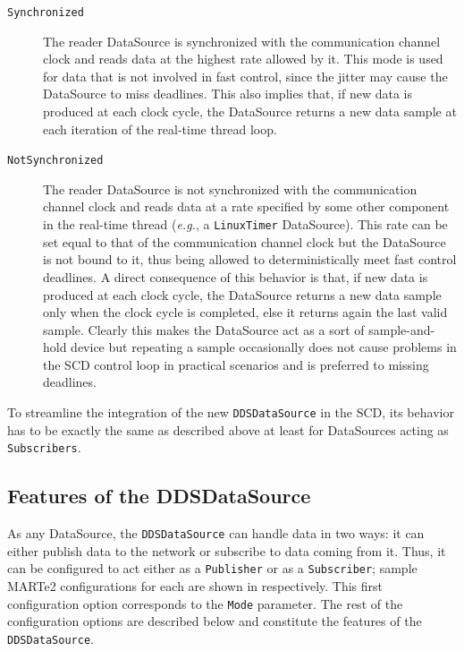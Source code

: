 \begin{description}
  \item[\texttt{Synchronized}] The reader DataSource is synchronized with the communication channel clock and reads data at the highest rate allowed by it. This mode is used for data that is not involved in fast control, since the jitter may cause the DataSource to miss deadlines. This also implies that, if new data is produced at each clock cycle, the DataSource returns a new data sample at each iteration of the real-time thread loop.
  \item[\texttt{NotSynchronized}] The reader DataSource is not synchronized with the communication channel clock and reads data at a rate specified by some other component in the real-time thread (\emph{e.g.}, a \texttt{LinuxTimer} DataSource). This rate can be set equal to that of the communication channel clock but the DataSource is not bound to it, thus being allowed to deterministically meet fast control deadlines. A direct consequence of this behavior is that, if new data is produced at each clock cycle, the DataSource returns a new data sample only when the clock cycle is completed, else it returns again the last valid sample. Clearly this makes the DataSource act as a sort of sample-and-hold device but repeating a sample occasionally does not cause problems in the SCD control loop in practical scenarios and is preferred to missing deadlines.
\end{description}
To streamline the integration of the new \texttt{DDSDataSource} in the SCD, its behavior has to be exactly the same as described above at least for DataSources acting as \texttt{Subscribers}.

\subsection{Features of the DDSDataSource}
\label{sec:ddsdatasource_features}
As any DataSource, the \texttt{DDSDataSource} can handle data in two ways: it can either publish data to the network or subscribe to data coming from it. Thus, it can be configured to act either as a \texttt{Publisher} or as a \texttt{Subscriber}; sample MARTe2 configurations for each are shown in  respectively. This first configuration option corresponds to the \texttt{Mode} parameter. The rest of the configuration options are described below and constitute the features of the \texttt{DDSDataSource}.

